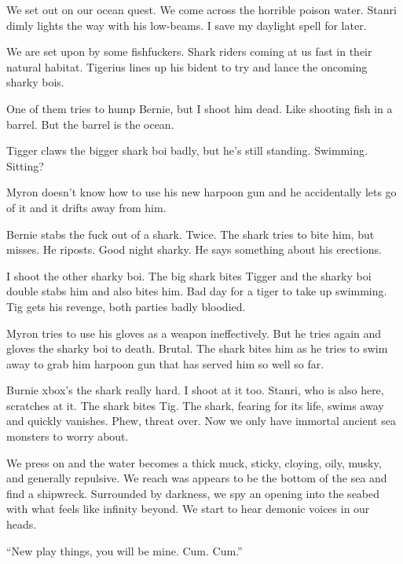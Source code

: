 We set out on our ocean quest. We come across the horrible poison water. Stanri dimly lights the way with his low-beams. I save my daylight spell for later.\medskip

We are set upon by some fishfuckers. Shark riders coming at us fast in their natural habitat. Tigerius lines up his bident to try and lance the oncoming sharky bois.\medskip

One of them tries to hump Bernie, but I shoot him dead. Like shooting fish in a barrel. But the barrel is the ocean.\medskip

Tigger claws the bigger shark boi badly, but he’s still standing. Swimming. Sitting?\medskip

Myron doesn’t know how to use his new harpoon gun and he accidentally lets go of it and it drifts away from him.\medskip

Bernie stabs the fuck out of a shark. Twice. The shark tries to bite him, but misses. He riposts. Good night sharky. He says something about his erections.\medskip

I shoot the other sharky boi. The big shark bites Tigger and the sharky boi double stabs him and also bites him. Bad day for a tiger to take up swimming. Tig gets his revenge, both parties badly bloodied.\medskip

Myron tries to use his gloves as a weapon ineffectively. But he tries again and gloves the sharky boi to death. Brutal. The shark bites him as he tries to swim away to grab him harpoon gun that has served him so well so far.\medskip

Burnie xbox’s the shark really hard. I shoot at it too. Stanri, who is also here, scratches at it. The shark bites Tig. The shark, fearing for its life, swims away and quickly vanishes. Phew, threat over. Now we only have immortal ancient sea monsters to worry about.\medskip

We press on and the water becomes a thick muck, sticky, cloying, oily, musky, and generally repulsive. We reach was appears to be the bottom of the sea and find a shipwreck. Surrounded by darkness, we spy an opening into the seabed with what feels like infinity beyond. We start to hear demonic voices in our heads.\medskip

“New play things, you will be mine. Cum. Cum.”\medskip

%

\clearpage
